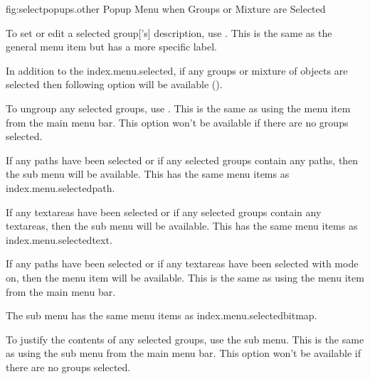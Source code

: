 

\FloatFig
  {fig:selectpopups.other}
  {}
  {Popup Menu when Groups or Mixture are Selected}


To set or edit a selected \gls{group}['s] description, use
. This is the same as
the general  menu item but has a more specific label.

In addition to the \gls{index.menu.selected},
if any \glspl{group} or mixture of \glspl{object} are selected 
then following option will be available
().


To ungroup any selected \glspl{group}, use
. This is the same as using the
 menu item from the main menu bar.
This option won't be available if there are no
\glspl{group} selected.


If any \glspl{path} have been selected or if any selected
\glspl{group} contain any \glspl{path}, then the
 sub menu will be available. This has the same
menu items as \gls{index.menu.selectedpath}.


If any \glspl{textarea} have been selected or if any selected
\glspl{group} contain any \glspl{textarea}, then the
 sub menu will be available. This has the same
menu items as \gls{index.menu.selectedtext}.


If any \glspl{path} have been selected or if any \glspl*{textarea}
have been selected with  mode on, then the
 menu item will be available. This is the
same as using the  menu item from the main
menu bar.


The  sub menu has the same
menu items as \gls{index.menu.selectedbitmap}.


To justify the contents of any selected \glspl{group}, use the
 sub menu. This is the same as using the
 sub menu from the main menu bar.
This option won't be available if there are no
\glspl{group} selected.


